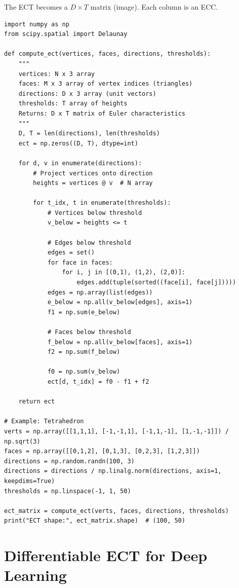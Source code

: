 The ECT becomes a $D \times T$ matrix (image). Each column is an ECC.

\begin{lstlisting}[style=python,caption=Discretized ECT computation]
import numpy as np
from scipy.spatial import Delaunay

def compute_ect(vertices, faces, directions, thresholds):
    """
    vertices: N x 3 array
    faces: M x 3 array of vertex indices (triangles)
    directions: D x 3 array (unit vectors)
    thresholds: T array of heights
    Returns: D x T matrix of Euler characteristics
    """
    D, T = len(directions), len(thresholds)
    ect = np.zeros((D, T), dtype=int)
    
    for d, v in enumerate(directions):
        # Project vertices onto direction
        heights = vertices @ v  # N array
        
        for t_idx, t in enumerate(thresholds):
            # Vertices below threshold
            v_below = heights <= t
            
            # Edges below threshold
            edges = set()
            for face in faces:
                for i, j in [(0,1), (1,2), (2,0)]:
                    edges.add(tuple(sorted((face[i], face[j]))))
            edges = np.array(list(edges))
            e_below = np.all(v_below[edges], axis=1)
            f1 = np.sum(e_below)
            
            # Faces below threshold
            f_below = np.all(v_below[faces], axis=1)
            f2 = np.sum(f_below)
            
            f0 = np.sum(v_below)
            ect[d, t_idx] = f0 - f1 + f2
    
    return ect

# Example: Tetrahedron
verts = np.array([[1,1,1], [-1,-1,1], [-1,1,-1], [1,-1,-1]]) / np.sqrt(3)
faces = np.array([[0,1,2], [0,1,3], [0,2,3], [1,2,3]])
directions = np.random.randn(100, 3)
directions = directions / np.linalg.norm(directions, axis=1, keepdims=True)
thresholds = np.linspace(-1, 1, 50)

ect_matrix = compute_ect(verts, faces, directions, thresholds)
print("ECT shape:", ect_matrix.shape)  # (100, 50)
\end{lstlisting}

\section{Differentiable ECT for Deep Learning}
\label{sec:ect:diff}


